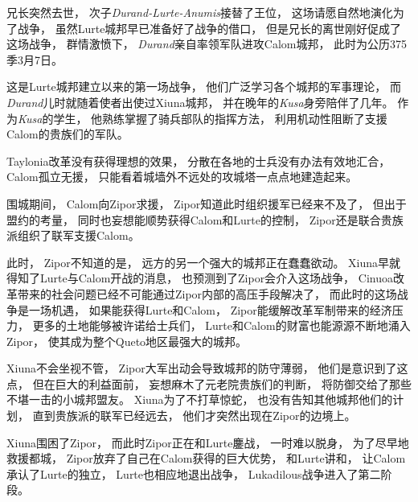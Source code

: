 \documentclass[UTF8,12pt,draft]{ctexbook}
\begin{document}
                兄长突然去世，
                次子\emph{Durand-Lurte-Anumis}接替了王位，
                这场请愿自然地演化为了战争，
                虽然Lurte城邦早已准备好了战争的借口，
                但是兄长的离世刚好促成了这场战争，
                群情激愤下，
                \emph{Durand}亲自率领军队进攻Calom城邦，
                此时为公历375季3月7日。

                这是Lurte城邦建立以来的第一场战争，
                他们广泛学习各个城邦的军事理论，
                而\emph{Durand}儿时就随着使者出使过Xiuna城邦，
                并在晚年的\emph{Kusa}身旁陪伴了几年。
                作为\emph{Kusa}的学生，
                他熟练掌握了骑兵部队的指挥方法，
                利用机动性阻断了支援Calom的贵族们的军队。

                Taylonia改革没有获得理想的效果，
                分散在各地的士兵没有办法有效地汇合，
                Calom孤立无援，
                只能看着城墙外不远处的攻城塔一点点地建造起来。

                围城期间，
                Calom向Zipor求援，
                Zipor知道此时组织援军已经来不及了，
                但出于盟约的考量，
                同时也妄想能顺势获得Calom和Lurte的控制，
                Zipor还是联合贵族派组织了联军支援Calom。

                此时，
                Zipor不知道的是，
                远方的另一个强大的城邦正在蠢蠢欲动。
                Xiuna早就得知了Lurte与Calom开战的消息，
                也预测到了Zipor会介入这场战争，
                Cinuoa改革带来的社会问题已经不可能通过Zipor内部的高压手段解决了，
                而此时的这场战争是一场机遇，
                如果能获得Lurte和Calom，
                Zipor能缓解改革军制带来的经济压力，
                更多的土地能够被许诺给士兵们，
                Lurte和Calom的财富也能源源不断地涌入Zipor，
                使其成为整个Queto地区最强大的城邦。

                Xiuna不会坐视不管，
                Zipor大军出动会导致城邦的防守薄弱，
                他们是意识到了这点，
                但在巨大的利益面前，
                妄想麻木了元老院贵族们的判断，
                将防御交给了那些不堪一击的小城邦盟友。
                Xiuna为了不打草惊蛇，
                也没有告知其他城邦他们的计划，
                直到贵族派的联军已经远去，
                他们才突然出现在Zipor的边境上。
                
                Xiuna围困了Zipor，
                而此时Zipor正在和Lurte鏖战，
                一时难以脱身，
                为了尽早地救援都城，
                Zipor放弃了自己在Calom获得的巨大优势，
                和Lurte讲和，
                让Calom承认了Lurte的独立，
                Lurte也相应地退出战争，
                Lukadilous战争进入了第二阶段。
\end{document}
